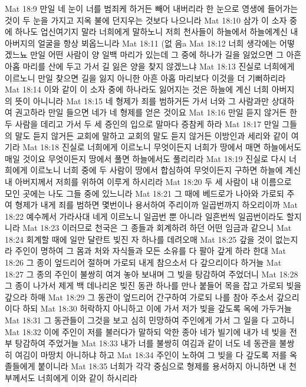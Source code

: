 Mat 18:9  만일 네 눈이 너를 범죄케 하거든 빼어 내버리라 한 눈으로 영생에 들어가는 것이 두 눈을 가지고 지옥 불에 던지우는 것보다 나으니라
Mat 18:10  삼가 이 소자 중에 하나도 업신여기지 말라 너희에게 말하노니 저희 천사들이 하늘에서 하늘에계신 내 아버지의 얼굴을 항상 뵈옵느니라
Mat 18:11  (없 음a
Mat 18:12  너희 생각에는 어떻겠느뇨 만일 어떤 사람이 양 일백 마리가 있는데 그 중에 하나가 길을 잃었으면 그 아흔 아홉 마리를 산에 두고 가서 길 잃은 양을 찾지 않겠느냐
Mat 18:13  진실로 너희에게 이르노니 만일 찾으면 길을 잃지 아니한 아흔 아홉 마리보다 이것을 더 기뻐하리라
Mat 18:14  이와 같이 이 소자 중에 하나라도 잃어지는 것은 하늘에 계신 너희 아버지의 뜻이 아니니라
Mat 18:15  네 형제가 죄를 범하거든 가서 너와 그 사람과만 상대하여 권고하라 만일 들으면 네가 네 형제를 얻은 것이요
Mat 18:16  만일 듣지 않거든 한 두 사람을 데리고 가서 두 세 증인의 입으로 말마다 증참케 하라
Mat 18:17  만일 그들의 말도 듣지 않거든 교회에 말하고 교회의 말도 듣지 않거든 이방인과 세리와 같이 여기라
Mat 18:18  진실로 너희에게 이르노니 무엇이든지 너희가 땅에서 매면 하늘에서도 매일 것이요 무엇이든지 땅에서 풀면 하늘에서도 풀리리라
Mat 18:19  진실로 다시 너희에게 이르노니 너희 중에 두 사람이 땅에서 합심하여 무엇이든지 구하면 하늘에 계신 내 아버지께서 저희를 위하여 이루게 하시리라
Mat 18:20  두 세 사람이 내 이름으로 모인 곳에는 나도 그들 중에 있느니라
Mat 18:21  그 때에 베드로가 나아와 가로되 주여 형제가 내게 죄를 범하면 몇번이나 용서하여 주리이까 일곱번까지 하오리이까
Mat 18:22  예수께서 가라사대 네게 이르노니 일곱번 뿐 아니라 일흔번씩 일곱번이라도 할지니라
Mat 18:23  이러므로 천국은 그 종들과 회계하려 하던 어떤 임금과 같으니
Mat 18:24  회계할 때에 일만 달란트 빚진 자 하나를 데려오매
Mat 18:25  갚을 것이 없는지라 주인이 명하여 그 몸과 처와 자식들과 모든 소유를 다 팔아 갚게 하라 한대
Mat 18:26  그 종이 엎드리어 절하며 가로되 내게 참으소서 다 갚으리이다 하거늘
Mat 18:27  그 종의 주인이 불쌍히 여겨 놓아 보내며 그 빚을 탕감하여 주었더니
Mat 18:28  그 종이 나가서 제게 백 데나리온 빚진 동관 하나를 만나 붙들어 목을 잡고 가로되 빚을 갚으라 하매
Mat 18:29  그 동관이 엎드리어 간구하여 가로되 나를 참아 주소서 갚으리이다 하되
Mat 18:30  허락하지 아니하고 이에 가서 저가 빚을 갚도록 옥에 가두거늘
Mat 18:31  그 동관들이 그것을 보고 심히 민망하여 주인에게 가서 그 일을 다 고하니
Mat 18:32  이에 주인이 저를 불러다가 말하되 악한 종아 네가 빌기에 내가 네 빚을 전부 탕감하여 주었거늘
Mat 18:33  내가 너를 불쌍히 여김과 같이 너도 네 동관을 불쌍히 여김이 마땅치 아니하냐 하고
Mat 18:34  주인이 노하여 그 빚을 다 갚도록 저를 옥졸들에게 붙이니라
Mat 18:35  너희가 각각 중심으로 형제를 용서하지 아니하면 내 천부께서도 너희에게 이와 같이 하시리라

